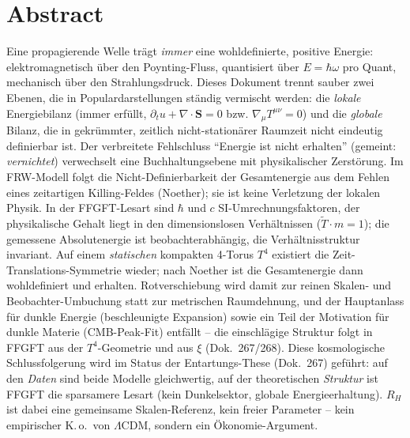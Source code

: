 
\section*{Abstract}
Eine propagierende Welle trägt \emph{immer} eine wohldefinierte, positive
Energie: elektromagnetisch über den Poynting-Fluss, quantisiert über
$E=\hbar\omega$ pro Quant, mechanisch über den Strahlungsdruck. Dieses
Dokument trennt sauber zwei Ebenen, die in Populardarstellungen ständig
vermischt werden: die \emph{lokale} Energiebilanz (immer erfüllt,
$\partial_t u + \nabla\!\cdot\mathbf S = 0$ bzw. $\nabla_\mu T^{\mu\nu}=0$)
und die \emph{globale} Bilanz, die in gekrümmter, zeitlich nicht-stationärer
Raumzeit nicht eindeutig definierbar ist. Der verbreitete Fehlschluss
\enquote{Energie ist nicht erhalten} (gemeint: \emph{vernichtet}) verwechselt
eine Buchhaltungsebene mit physikalischer Zerstörung. Im FRW-Modell folgt die
Nicht-Definierbarkeit der Gesamtenergie aus dem Fehlen eines zeitartigen
Killing-Feldes (Noether); sie ist keine Verletzung der lokalen Physik. In der
FFGFT-Lesart sind $\hbar$ und $c$ SI-Umrechnungsfaktoren, der physikalische
Gehalt liegt in den dimensionslosen Verhältnissen ($\tilde T\cdot m = 1$); die
gemessene Absolutenergie ist beobachterabhängig, die Verhältnisstruktur
invariant. Auf einem \emph{statischen} kompakten 4-Torus $T^4$ existiert die
Zeit-Translations-Symmetrie wieder; nach Noether ist die Gesamtenergie dann
wohldefiniert und erhalten. Rotverschiebung wird damit zur reinen Skalen- und
Beobachter-Umbuchung statt zur metrischen Raumdehnung, und der Hauptanlass für
dunkle Energie (beschleunigte Expansion) sowie ein Teil der Motivation für
dunkle Materie (CMB-Peak-Fit) entfällt -- die einschlägige Struktur folgt in
FFGFT aus der $T^4$-Geometrie und aus $\xi$ (Dok.~267/268). Diese
kosmologische Schlussfolgerung wird im Status der Entartungs-These (Dok.~267)
geführt: auf den \emph{Daten} sind beide Modelle gleichwertig, auf der
theoretischen \emph{Struktur} ist FFGFT die sparsamere Lesart (kein
Dunkelsektor, globale Energieerhaltung). $R_H$ ist dabei eine gemeinsame
Skalen-Referenz, kein freier Parameter -- kein empirischer K.\,o.\ von
$\Lambda$CDM, sondern ein Ökonomie-Argument.

